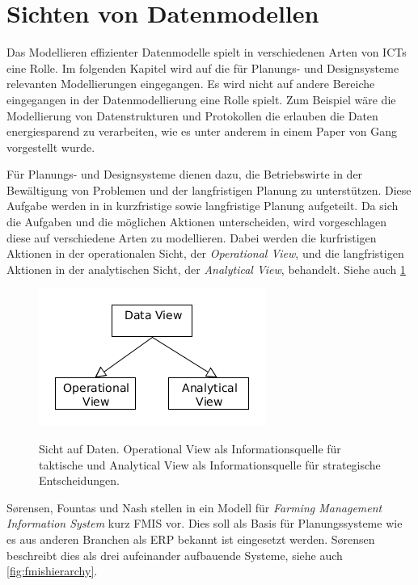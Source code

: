 \section{Sichten von Datenmodellen}
Das Modellieren effizienter Datenmodelle spielt in verschiedenen Arten von ICTs eine Rolle. Im folgenden Kapitel wird auf die für Planungs- und Designsysteme relevanten Modellierungen eingegangen. Es wird nicht auf andere Bereiche eingegangen in der Datenmodellierung eine Rolle spielt. Zum Beispiel wäre die Modellierung von Datenstrukturen und Protokollen die erlauben die Daten energiesparend zu verarbeiten, wie es unter anderem in einem Paper von Gang\cite{jour:Lu2007} vorgestellt wurde.

Für Planungs- und Designsysteme dienen dazu, die Betriebswirte in der Bewältigung von Problemen und der langfristigen Planung zu unterstützen. Diese Aufgabe werden in \cite{jour:Schulze2007} in kurzfristige sowie langfristige Planung aufgeteilt. Da sich die Aufgaben und die möglichen Aktionen unterscheiden, wird vorgeschlagen diese auf verschiedene Arten zu modellieren. Dabei werden die kurfristigen Aktionen in der operationalen Sicht, der \textit{Operational View}, und die langfristigen Aktionen in der analytischen Sicht, der \textit{Analytical View}, behandelt. Siehe auch \ref{fig:dataviews}

\begin{figure}[h]
 \includegraphics[natwidth=\textwidth]{figures/datamodelling/dataviews.png}
 \centering
 \label{fig:dataviews}
 \caption{Sicht auf Daten. Operational View als Informationsquelle für taktische und Analytical View als Informationsquelle für strategische Entscheidungen.}
\end{figure}

S\o rensen, Fountas und Nash stellen in \cite{jour:Sorensen2010} ein Modell für \textit{Farming Management Information System} kurz FMIS vor. Dies soll als Basis für Planungssysteme wie es aus anderen Branchen als ERP bekannt ist eingesetzt werden. S\o rensen beschreibt dies als drei aufeinander aufbauende Systeme, siehe auch \ref{fig:fmishierarchy}.

